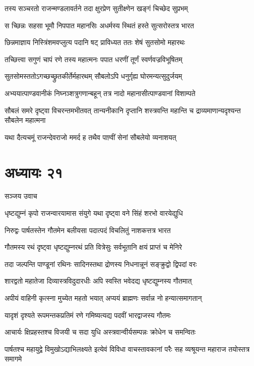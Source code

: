 \twolineshloka
{तस्य सञ्चरतो राजन्मण्डलावर्तने तदा}
{क्षुरप्रेण सुतीक्ष्णेन खङ्गं चिच्छेद सुप्रभम्}


\twolineshloka
{स च्छिन्नः सहसा भूमौ निपपात महानसिः}
{अधर्मस्य स्थितं हस्ते सुत्सरोस्तत्र भारत}


\twolineshloka
{छिन्नमाज्ञाय निस्त्रिंशमवप्लुत्य पदानि षट्}
{प्राविध्यत ततः शेषं सुतसोमो महारथः}


\twolineshloka
{तच्छित्त्वा सगुणं चापं रणे तस्य महात्मनः}
{पपात धरणीं तूर्णं स्वर्णवज्रविभूषितम्}


\twolineshloka
{सुतसोमस्ततोऽगच्छच्छ्रुतकीर्तेर्महारथम्}
{सौबलोऽपि धनुर्गृह्य घोरमन्यत्सुदुर्जयम्}


\twolineshloka
{अभ्ययात्पाण्डवानीकं निघ्नञ्शत्रुगणान्बहून्}
{तत्र नादो महानासीत्पाण्डवानां विशाम्पते}


\threelineshloka
{सौबलं समरे दृष्ट्वा विचरन्तमभीतवत्}
{तान्यनीकानि दृप्तानि शस्त्रवन्ति महान्ति च}
{द्राव्यमाणान्यदृश्यन्त सौबलेन महात्मना}


\twolineshloka
{यथा दैत्यचमूं राजन्देवराजो ममर्द ह}
{तथैव पाण़्वीं सेनां सौबलेयो व्यनाशयत्}


\chapter{अध्यायः २१}
\twolineshloka
{सञ्जय उवाच}
{}


\twolineshloka
{धृष्टद्युम्नं कृपो राजन्वारयामास संयुगे}
{यथा दृष्ट्वा वने सिंहं शरभो वारयेद्युधि}


\twolineshloka
{निरुद्वः पार्षतस्तेन गौतमेन बलीयसा}
{पदात्पदं विचलितुं नाशकत्तत्र भारत}


\twolineshloka
{गौतमस्य रथं दृष्ट्वा धृष्टद्युम्नरथं प्रति}
{वित्रेसुः सर्वभूतानि क्षयं प्राप्तं च मेनिरे}


\twolineshloka
{तदा जल्पन्ति पाण्डूनां रथिनः सादिनस्तथा}
{द्रोणस्य निधनान्नूनं सङ्क्रुद्वो द्विपदां वरः}


\twolineshloka
{शारद्वतो महातेजा दिव्यास्त्रविदुदारधीः}
{अपि स्वस्ति भवेदद्य धृष्टद्युम्नस्य गौतमात्}


\twolineshloka
{अपीयं वाहिनी कृत्स्ना मुच्येत महतो भयात्}
{अप्ययं ब्राह्मणः सर्वान्न नो हन्यात्समागतान्}


\twolineshloka
{यादृशं दृश्यते रूपमन्तकप्रतिमं रणे}
{गमिष्यत्यद्य पदवीं भारद्वाजस्य गौतमः}


\twolineshloka
{आचार्यः क्षिप्रहस्तश्च विजयी च सदा युधि}
{अस्त्रवान्वीर्यसम्पन्नः क्रोधेन च समन्वितः}


\threelineshloka
{पार्षतश्च महायुद्वे विमुखोऽद्याभिलक्ष्यते}
{इत्येवं विविधा वाचस्तावकानां परैः सह}
{व्यश्रूयन्त महाराज तयोस्तत्र समागमे}


